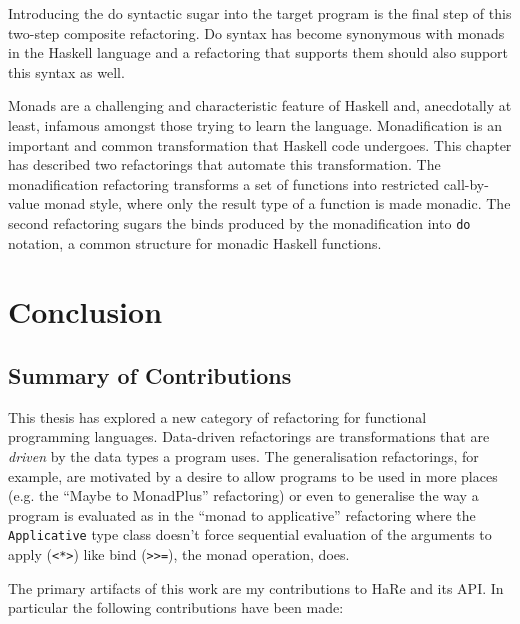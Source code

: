 Introducing the do syntactic sugar into the target program is the final step of this two-step composite refactoring. Do syntax has become synonymous with monads in the Haskell language and a refactoring that supports them should also support this syntax as well.

Monads are a challenging and characteristic feature of Haskell and, anecdotally at least, infamous amongst those trying to learn the language. Monadification is an important and common transformation that Haskell code undergoes. This chapter has described two refactorings that automate this transformation. The monadification refactoring transforms a set of functions into restricted call-by-value monad style, where only the result type of a function is made monadic. The second refactoring sugars the binds produced by the monadification into \texttt{do} notation, a common structure for monadic Haskell functions.

\chapter{Conclusion}
\label{chp:conc}

\section{Summary of Contributions}

This thesis has explored a new category of refactoring for functional programming languages. Data-driven refactorings are transformations that are \textit{driven} by the data types a program uses. The generalisation refactorings, for example, are motivated by a desire to allow programs to be used in more places (e.g. the ``Maybe to MonadPlus'' refactoring) or even to generalise the way a program is evaluated as in the ``monad to applicative'' refactoring where the \texttt{Applicative} type class doesn't force sequential evaluation of the arguments to apply (\texttt{<*>}) like bind (\texttt{>>=}), the monad operation, does.

The primary artifacts of this work are my contributions to HaRe and its API. In particular the following contributions have been made:

